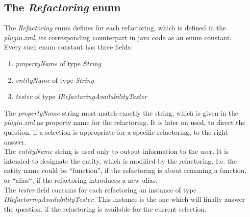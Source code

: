 \documentclass[a4paper,10pt]{report}
\begin{document}
\subsection{The {\it Refactoring} enum}
The {\it Refactoring} enum defines for each refactoring, which is defined in the {\it plugin.xml}, its corresponding counterpart in java code as an enum constant.
Every such enum constant has three fields:
   \begin{enumerate}
     \item {\it propertyName} of type {\it String}
     \item {\it entityName} of type {\it String}
     \item {\it tester}  of type {\it IRefactoringAvailabilityTester}
   \end{enumerate}
The {\it propertyName} string must match exactly the string, which is given in the {\it plugin.xml} as property name for the refactoring. 
It is later on used, to direct the question, if a selection is appropriate for a specific refactoring, to the right answer.\\
The {\it entityName} string is used only to output information to the user. It is intended to designate the entity, which is modified by the refactoring. I.e. the entity name could be ``function'', if the refactoring is about renaming a function, or ``alias``, if the refactoring introduces a new alias.\\
The {\it tester} field contains for each refactoring an instance of type {\it IRefactoringAvailabilityTester}. This instance is the one which will finally answer the question, if the refactoring is available for the current selection.
\end{document}
